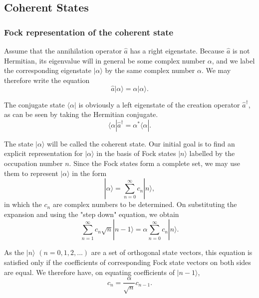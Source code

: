 \subsection{Coherent States}

\subsubsection{Fock representation of the coherent state}


Assume that the annihilation operator $\hat{a}$ has a right eigenstate. Because $\hat{a}$ is not Hermitian, its eigenvalue will in general be some complex number $\alpha$, and we label the corresponding eigenstate $|\alpha\rangle$ by the same complex number $\alpha$. We may therefore write the equation
\begin{equation*} \hat{a}|\alpha\rangle=\alpha|\alpha\rangle. \end{equation*}

The conjugate state $\langle\alpha|$ is obviously a left eigenstate of the creation operator $\hat{a}^{\dagger}$, as can be seen by taking the Hermitian conjugate.
\begin{equation*} \langle\alpha|\hat{a}^{\dagger}=\alpha^{*}\langle\alpha|. \end{equation*}

The state $|\alpha\rangle$ will be called the coherent state. Our initial goal is to find an explicit representation for $|\alpha\rangle$ in the basis of Fock states $|n\rangle$ labelled by the occupation number $n$. Since the Fock states form a complete set, we may use them to represent $|\alpha\rangle$ in the form
\begin{equation*} |\alpha\rangle=\sum_{n=0}^{\infty}c_{n}|n\rangle, \end{equation*}
in which the $c_{n}$ are complex numbers to be determined. On substituting the expansion and using the "step down" equation, we obtain
\begin{equation*} \sum_{n=1}^{\infty}c_{n}\sqrt{n}|n-1\rangle=\alpha\sum_{n=0}^{\infty}c_{n}|n\rangle. \end{equation*}

As the $|n\rangle$ $(n=0,1,2,...)$ are a set of orthogonal state vectors, this equation is satisfied only if the coefficients of corresponding Fock state vectors on both sides are equal. We therefore have, on equating coefficients of $|n-1\rangle$,
\begin{equation*} c_{n}=\frac{\alpha}{\sqrt{n}}c_{n-1}. \end{equation*}

